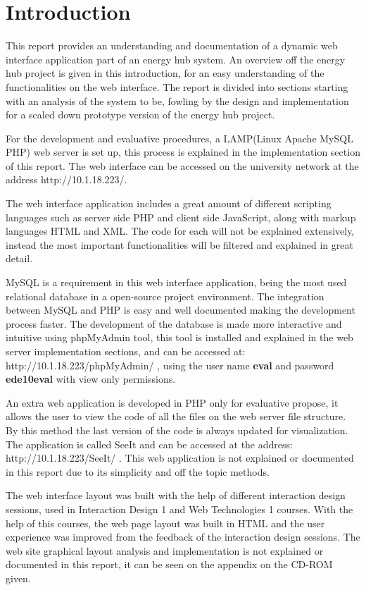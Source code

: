 \chapter{Introduction}
This report provides an understanding and documentation of a dynamic web interface application part of an energy hub system. An overview off the energy hub project is given in this introduction, for an easy understanding of the functionalities on the web interface. The report is divided into sections starting with an analysis of the system to be, fowling by the design and implementation for a scaled down prototype version of the energy hub project. 

For the development and evaluative procedures, a LAMP(Linux Apache MySQL PHP) web server is set up, this process is explained in the implementation section of this report. The web interface can be accessed on the university network at the address http://10.1.18.223/.

The web interface application includes a great amount of different scripting languages such as server side PHP and client side JavaScript, along with markup languages HTML and XML. The code for each will not be explained extensively, instead the most important functionalities will be filtered and explained in great detail.

MySQL is a requirement in this web interface application, being the most used relational database in a open-source project environment. The integration between MySQL and PHP is easy and well documented making the development process faster. The development of the database is made more interactive and intuitive using phpMyAdmin tool, this tool is installed and explained in the web server implementation sections, and can be accessed at: http://10.1.18.223/phpMyAdmin/ , using the user name \textbf{eval} and password \textbf{ede10eval} with view only permissions.

An extra web application is developed in PHP only for evaluative propose, it allows the user to view the code of all the files on the web server file structure. By this method the last version of the code is always updated for visualization. The application is called SeeIt and can be accessed at the address: http://10.1.18.223/SeeIt/ . This web application is not explained or documented in this report due to its simplicity and off the topic methods.

The web interface layout was built with the help of different interaction design sessions, used in Interaction Design 1 and Web Technologies 1 courses. With the help of this courses, the web page layout was built in HTML and the user experience was improved from the feedback of the interaction design sessions. The web site graphical layout analysis and implementation is not explained or documented in this report, it can be seen on the appendix on the CD-ROM given.

